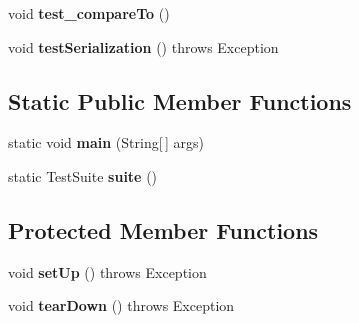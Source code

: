 \begin{DoxyCompactItemize}
\item 
\hypertarget{classorg_1_1joda_1_1time_1_1field_1_1_test_scaled_duration_field_ad8343909ffae8592060a59cbc2dd1157}{void {\bfseries test\-\_\-compare\-To} ()}\label{classorg_1_1joda_1_1time_1_1field_1_1_test_scaled_duration_field_ad8343909ffae8592060a59cbc2dd1157}

\item 
\hypertarget{classorg_1_1joda_1_1time_1_1field_1_1_test_scaled_duration_field_a94fe892b3159b9c1d08124b3bd86ad7a}{void {\bfseries test\-Serialization} ()  throws Exception }\label{classorg_1_1joda_1_1time_1_1field_1_1_test_scaled_duration_field_a94fe892b3159b9c1d08124b3bd86ad7a}

\end{DoxyCompactItemize}
\subsection*{Static Public Member Functions}
\begin{DoxyCompactItemize}
\item 
\hypertarget{classorg_1_1joda_1_1time_1_1field_1_1_test_scaled_duration_field_ace1884d0483ad6c0de8629ac7ef73378}{static void {\bfseries main} (String\mbox{[}$\,$\mbox{]} args)}\label{classorg_1_1joda_1_1time_1_1field_1_1_test_scaled_duration_field_ace1884d0483ad6c0de8629ac7ef73378}

\item 
\hypertarget{classorg_1_1joda_1_1time_1_1field_1_1_test_scaled_duration_field_a95eb51ce77b797d0c96d866c3482ed95}{static Test\-Suite {\bfseries suite} ()}\label{classorg_1_1joda_1_1time_1_1field_1_1_test_scaled_duration_field_a95eb51ce77b797d0c96d866c3482ed95}

\end{DoxyCompactItemize}
\subsection*{Protected Member Functions}
\begin{DoxyCompactItemize}
\item 
\hypertarget{classorg_1_1joda_1_1time_1_1field_1_1_test_scaled_duration_field_ac7494f5628984c543df135490640e836}{void {\bfseries set\-Up} ()  throws Exception }\label{classorg_1_1joda_1_1time_1_1field_1_1_test_scaled_duration_field_ac7494f5628984c543df135490640e836}

\item 
\hypertarget{classorg_1_1joda_1_1time_1_1field_1_1_test_scaled_duration_field_a30d98fc9e1e21e5099b0a2ad045e8b26}{void {\bfseries tear\-Down} ()  throws Exception }\label{classorg_1_1joda_1_1time_1_1field_1_1_test_scaled_duration_field_a30d98fc9e1e21e5099b0a2ad045e8b26}

\end{DoxyCompactItemize}


